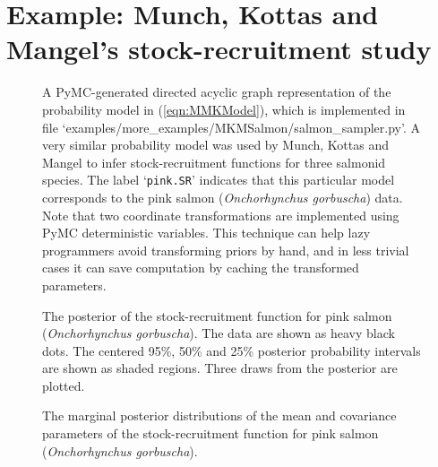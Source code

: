 \section{Example: Munch, Kottas and Mangel's stock-recruitment study}\label{sub:MMKMCMC}

\begin{figure}
    \centering
    \caption{A PyMC-generated directed acyclic graph representation of the probability model in (\ref{eqn:MMKModel}), which is implemented in file \textsf{`examples/more_examples/MKMSalmon/salmon_sampler.py'}. A very similar probability model was used by Munch, Kottas and Mangel to infer stock-recruitment functions for three salmonid species. The label `\texttt{pink.SR}' indicates that this particular model corresponds to the pink salmon (\emph{Onchorhynchus gorbuscha}) data. Note that two coordinate transformations are implemented using PyMC deterministic variables. This technique can help lazy programmers avoid transforming priors by hand, and in less trivial cases it can save computation by caching the transformed parameters.}
    \label{fig:MMKsalmonmodel}
\end{figure}

\begin{figure}
    \centering
    \caption{The posterior of the stock-recruitment function for pink salmon (\emph{Onchorhynchus gorbuscha}). The data are shown as heavy black dots. The centered 95\%, 50\% and 25\% posterior probability intervals are shown as shaded regions. Three draws from the posterior are plotted.}
    \label{fig:pinkfpost}
\end{figure}

\begin{figure}
    \centering
    \caption{The marginal posterior distributions of the mean and covariance parameters of the stock-recruitment function for pink salmon (\emph{Onchorhynchus gorbuscha}).}
    \label{fig:pinkparams}
\end{figure}

